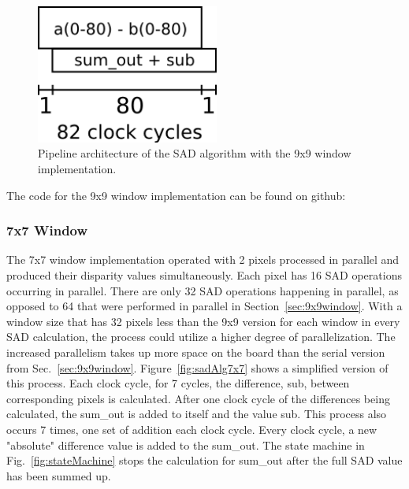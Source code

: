 \begin{figure}[h]
	\begin{center}
		\includegraphics[width=60mm]{figures/sadPipeline9x9.png}
		\captionfonts
		\caption{Pipeline architecture of the SAD algorithm with the 9x9 window implementation.}
		\label{fig:sadPipe9x9}
	\end{center}
\end{figure}

The code for the 9x9 window implementation can be found on github:
\\

\subsubsection{7x7 Window}
\label{sec:7x7window}

The 7x7 window implementation operated with 2 pixels processed in parallel and produced their disparity values simultaneously. Each pixel has 16 SAD operations occurring in parallel. There are only 32 SAD operations happening in parallel, as opposed to 64 that were performed in parallel in Section~\ref{sec:9x9window}. With a window size that has 32 pixels less than the 9x9 version for each window in every SAD calculation, the process could utilize a higher degree of parallelization. The increased parallelism takes up more space on the board than the serial version from Sec.~\ref{sec:9x9window}. Figure~\ref{fig:sadAlg7x7} shows a simplified version of this process. Each clock cycle, for 7 cycles, the difference, sub, between corresponding pixels is calculated. After one clock cycle of the differences being calculated, the sum\_out is added to itself and the value sub. This process also occurs 7 times, one set of addition each clock cycle. Every clock cycle, a new "absolute" difference value is added to the sum\_out. The state machine in Fig.~\ref{fig:stateMachine} stops the calculation for sum\_out after the full SAD value has been summed up.

